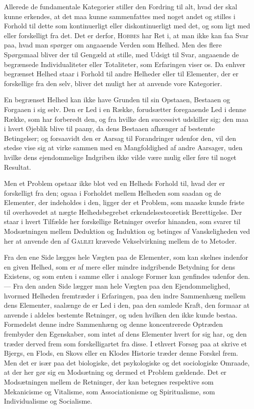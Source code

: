 \documentclass[12pt]{article}
\newcommand{\opage}[1]{\marginnote{\footnotesize\textit{[#1]}}}
\begin{document}
Allerede de fundamentale Kategorier stiller den Fordring til alt, hvad der skal
kunne erkendes, at det maa kunne sammenfattes med noget andet og stilles i
Forhold til dette som kontinuerligt eller diskontinuerligt med det, og som ligt med eller
forskelligt fra det. Det er derfor, \textsc{Hobbes} har Ret i, at man ikke kan faa Svar
paa, hvad man spørger om angaaende Verden som Helhed. Men des flere
Spørgsmaal bliver der til Gengæld at stille, med Udsigt til Svar, angaaende de begrænsede
Individualiteter eller Totaliteter, som Erfaringen viser os. Da enhver begrænset
Helhed staar i Forhold til andre Helheder eller til Elementer, der er forskellige
fra den selv, bliver det muligt her at anvende vore Kategorier.

En begrænset Helhed kan ikke have Grunden til sin Opstaaen, Bestaaen og
Forgaaen i sig selv. Den er Led i en Række, forudsætter foregaaende Led i denne
Række, som har forberedt den, og fra hvilke den successivt udskiller sig; den maa
i hvert Øjeblik blive til paany, da dens Bestaaen afhænger af bestemte
Betingelser; og forsaavidt den er Aarsag til Forandringer udenfor den, vil den stedse
vise sig at virke sammen med en Mangfoldighed af andre Aarsager, uden hvilke
\opage{22}dens ejendommelige Indgriben ikke vilde være mulig eller føre til noget
Resultat.

Men et Problem opstaar ikke blot ved en Helheds Forhold til, hvad der er
forskelligt fra den; ogsaa i Forholdet mellem Helheden som saadan og de
Elementer, der indeholdes i den, ligger der et Problem, som maaske kunde friste til
overhovedet at nægte Helhedsbegrebet erkendelsesteoretisk Berettigelse. Der staar i hvert
Tilfælde her forskellige Retninger overfor hinanden, som svarer til Modsætningen
mellem Deduktion og Induktion og betinges af Vanskeligheden ved her at anvende
den af \textsc{Galilei} krævede Vekselvirkning mellem de to Metoder.

Fra den ene Side lægges hele Vægten paa de Elementer, som kan skelnes
indenfor en given Helhed, som er af mere eller mindre indgribende Betydning for
dens Existens, og som enten i samme eller i analoge Former kan genfindes
udenfor den. --- Fra den anden Side lægger man hele Vægten paa den
Ejendommelighed, hvormed Helheden fremtræder i Erfaringen, paa den indre Sammenhæng
mellem dens Elementer, saalænge de er Led i den, paa den samlede Kraft, den
formaar at anvende i aldeles bestemte Retninger, og uden hvilken den ikke kunde
bestaa. Formedelst denne indre Sammenhæng og denne koncentrerede Optræden
frembyder den Egenskaber, som intet af dens Elementer hvert for sig har, og den
træder derved frem som forskelligartet fra disse. I ethvert Forsøg paa at skrive et
Bjergs, en Flods, en Skovs eller en Klodes Historie træder denne Forskel frem.
Men det er især paa det biologiske, det psykologiske og det sociologiske Omraade,
at der her gør sig en Modsætning og dermed et Problem gældende. Det er
Modsætningen mellem de Retninger, der kan betegnes respektive som Mekanicisme og
Vitalisme, som Associationisme og Spiritualisme, som Individualisme og Socialisme.
\end{document}
